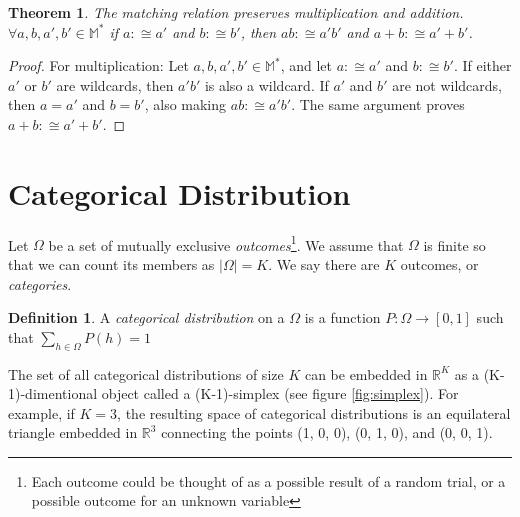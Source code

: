 \documentclass[twoside]{article}
\theoremstyle{plain}%
\newtheorem{theorem}{Theorem}[section]
\theoremstyle{definition}
\newtheorem{definition}{Definition}[section]
\theoremstyle{remark}
\begin{document}
\begin{theorem}
\label{theorem:matching_multiplication}
The matching relation preserves multiplication and addition. \(\forall a,b,a',b' \in \mathbb{M^*}\) if \(a :\cong a'\) and \(b :\cong b'\), then \(ab :\cong a'b'\) and \(a+b :\cong a'+b'\).
\end{theorem}

\begin{proof}
For multiplication: Let \(a,b,a',b' \in \mathbb{M^*}\), and let \(a :\cong a'\) and \(b :\cong b'\). If either \(a'\) or \(b'\) are wildcards, then \(a'b'\) is also a wildcard. If \(a'\) and \(b'\) are not wildcards, then \(a = a'\) and \(b = b'\), also making \(ab :\cong a'b'\).
The same argument proves \(a+b :\cong a'+b'\).
\end{proof}

\section{Categorical Distribution}

Let \(\Omega\) be a set of mutually exclusive \textit{outcomes}\footnote{Each outcome could be thought of as a possible result of a random trial, or a possible outcome for an unknown variable}. We assume that \(\Omega\) is finite so that we can count its members as \(|\Omega| = K\). We say there are \(K\) outcomes, or \textit{categories}.

\begin{definition}
\label{def:categorical_abs}
A \textit{categorical distribution} on a \(\Omega\) is a function \(P: \Omega \rightarrow [0, 1]\) such that \(\sum_{h \in \Omega} P(h) = 1\)
\end{definition}

The set of all categorical distributions of size \(K\) can be embedded in \(\mathbb{R}^K\) as a (K-1)-dimentional object called a (K-1)-simplex (see figure \ref{fig:simplex}). For example, if \(K = 3\), the resulting space of categorical distributions is an equilateral triangle embedded in \(\mathbb{R}^3\) connecting the points (1, 0, 0), (0, 1, 0), and (0, 0, 1).
\end{document}
